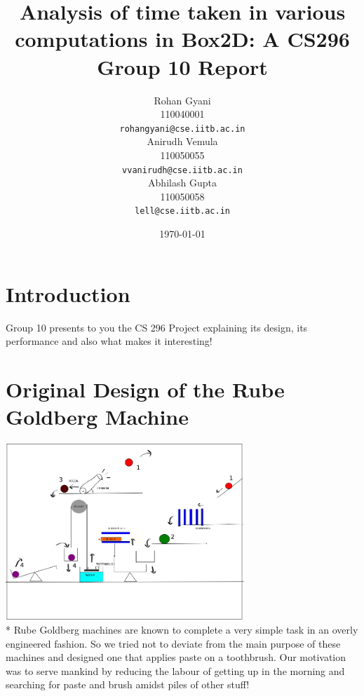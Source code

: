 \documentclass[11pt]{article}
\begin{document}
\title {Analysis of time taken in various computations in Box2D: A CS296 Group 10 Report} 
\author{Rohan Gyani\\
  110040001\\
  \texttt{rohangyani@cse.iitb.ac.in}\\
  Anirudh Vemula\\
  110050055\\
  \texttt{vvanirudh@cse.iitb.ac.in}\\
  Abhilash Gupta \\
  110050058\\
  \texttt{lell@cse.iitb.ac.in}\\
  }
\date{\today}

\maketitle

\section{Introduction}
Group 10 presents to you the CS 296 Project explaining its design, its performance and also what makes it interesting! 
\cite{stackoverflow12,roberts13}
\section{Original Design of the Rube Goldberg Machine}
\includegraphics[height=8 cm,width=9cm]{doc/orig-machine}
\\*
Rube Goldberg machines are known to complete a very simple task in an overly engineered fashion. So we tried not to deviate from the main purpose of these machines and designed one that applies paste on a toothbrush. Our motivation was to serve mankind by reducing the labour of getting up in the morning and searching for paste and brush amidst piles of other stuff!
\end{document}
